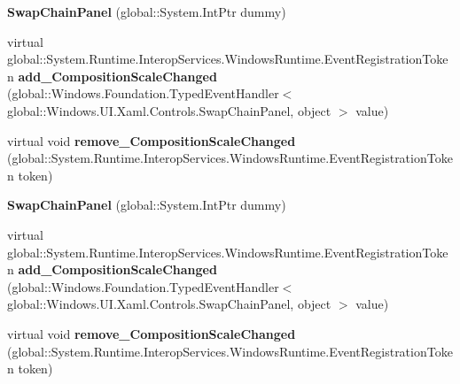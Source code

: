 \begin{DoxyCompactItemize}
\item 
\mbox{\label{class_windows_1_1_u_i_1_1_xaml_1_1_controls_1_1_swap_chain_panel_a6de3689912620c444d7d52113f389d56}} 
{\bfseries Swap\+Chain\+Panel} (global\+::\+System.\+Int\+Ptr dummy)
\item 
\mbox{\label{class_windows_1_1_u_i_1_1_xaml_1_1_controls_1_1_swap_chain_panel_a1e9bf0904d5c5eb2ae257878d54180b3}} 
virtual global\+::\+System.\+Runtime.\+Interop\+Services.\+Windows\+Runtime.\+Event\+Registration\+Token {\bfseries add\+\_\+\+Composition\+Scale\+Changed} (global\+::\+Windows.\+Foundation.\+Typed\+Event\+Handler$<$ global\+::\+Windows.\+U\+I.\+Xaml.\+Controls.\+Swap\+Chain\+Panel, object $>$ value)
\item 
\mbox{\label{class_windows_1_1_u_i_1_1_xaml_1_1_controls_1_1_swap_chain_panel_a50e6f6e6ea2dc3470be06877f3ac04b8}} 
virtual void {\bfseries remove\+\_\+\+Composition\+Scale\+Changed} (global\+::\+System.\+Runtime.\+Interop\+Services.\+Windows\+Runtime.\+Event\+Registration\+Token token)
\item 
\mbox{\label{class_windows_1_1_u_i_1_1_xaml_1_1_controls_1_1_swap_chain_panel_a6de3689912620c444d7d52113f389d56}} 
{\bfseries Swap\+Chain\+Panel} (global\+::\+System.\+Int\+Ptr dummy)
\item 
\mbox{\label{class_windows_1_1_u_i_1_1_xaml_1_1_controls_1_1_swap_chain_panel_a1e9bf0904d5c5eb2ae257878d54180b3}} 
virtual global\+::\+System.\+Runtime.\+Interop\+Services.\+Windows\+Runtime.\+Event\+Registration\+Token {\bfseries add\+\_\+\+Composition\+Scale\+Changed} (global\+::\+Windows.\+Foundation.\+Typed\+Event\+Handler$<$ global\+::\+Windows.\+U\+I.\+Xaml.\+Controls.\+Swap\+Chain\+Panel, object $>$ value)
\item 
\mbox{\label{class_windows_1_1_u_i_1_1_xaml_1_1_controls_1_1_swap_chain_panel_a50e6f6e6ea2dc3470be06877f3ac04b8}} 
virtual void {\bfseries remove\+\_\+\+Composition\+Scale\+Changed} (global\+::\+System.\+Runtime.\+Interop\+Services.\+Windows\+Runtime.\+Event\+Registration\+Token token)

\end{DoxyCompactItemize}
